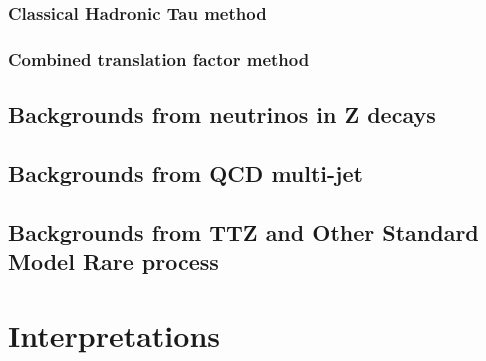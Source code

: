 \subsubsection{Classical Hadronic Tau method}
\subsubsection{Combined translation factor method}

\clearpage
\subsection{Backgrounds from neutrinos in Z decays}

\clearpage
\subsection{Backgrounds from QCD multi-jet}
\label{sec:c4bgqcd}


\subsection{Backgrounds from TTZ and Other Standard Model Rare process}

\section{Interpretations}
